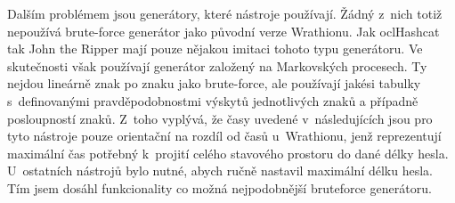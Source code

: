 Dalším problémem jsou generátory, které nástroje používají. Žádný z~nich totiž nepoužívá
 brute-force generátor jako původní verze Wrathionu. Jak oclHashcat tak John the
Ripper mají pouze nějakou imitaci tohoto typu generátoru. Ve skutečnosti však používají generátor
založený na Markovských procesech. Ty nejdou lineárně znak po znaku jako brute-force, ale
používají jakési tabulky s~definovanými pravděpodobnostmi výskytů jednotlivých znaků a případně
posloupností znaků. Z~toho vyplývá, že časy uvedené v~následujících jsou pro tyto nástroje pouze
orientační na rozdíl od časů u~Wrathionu, jenž reprezentují maximální čas potřebný k~projití
celého stavového prostoru do dané délky hesla. U~ostatních nástrojů bylo nutné, abych ručně
nastavil maximální délku hesla. Tím jsem dosáhl funkcionality co možná nejpodobnější brute\-force
generátoru.
\shorthandoff{-}
